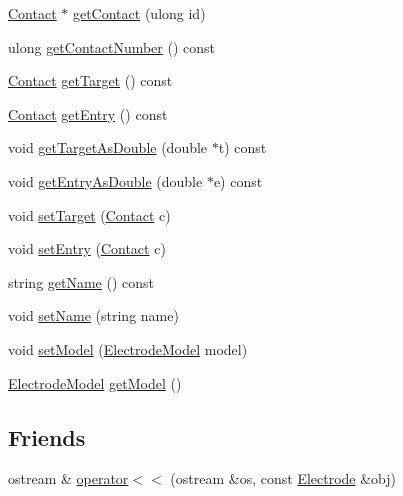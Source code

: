 \begin{DoxyCompactItemize}
\item 
\hyperlink{classElectrode_ac64c4a90469345a5d3e260da59765a76}{Contact} $\ast$ \hyperlink{classElectrode_a16095d3177a018d40cca9e13064c69ee}{get\-Contact} (ulong id)
\item 
ulong \hyperlink{classElectrode_af9d256a3bca0873bf10177ed7acc8158}{get\-Contact\-Number} () const 
\item 
\hyperlink{classElectrode_ac64c4a90469345a5d3e260da59765a76}{Contact} \hyperlink{classElectrode_ae00ce79f47c986adedfdc34de26a4956}{get\-Target} () const 
\item 
\hyperlink{classElectrode_ac64c4a90469345a5d3e260da59765a76}{Contact} \hyperlink{classElectrode_a63534a9fcf275e30a3897bc6d5c6daec}{get\-Entry} () const 
\item 
void \hyperlink{classElectrode_a7d1686e3aaf200d8eeacd5ba5ca9b8f6}{get\-Target\-As\-Double} (double $\ast$t) const 
\item 
void \hyperlink{classElectrode_a63b949ff99a7c5a25ee2a1615231d2da}{get\-Entry\-As\-Double} (double $\ast$e) const 
\item 
void \hyperlink{classElectrode_ae1db2afe30ebad7c71a04a0c4f39b326}{set\-Target} (\hyperlink{classElectrode_ac64c4a90469345a5d3e260da59765a76}{Contact} c)
\item 
void \hyperlink{classElectrode_a2092b73cb83d1d54ff3a55a0095ffdac}{set\-Entry} (\hyperlink{classElectrode_ac64c4a90469345a5d3e260da59765a76}{Contact} c)
\item 
string \hyperlink{classElectrode_a19fa13d91444e67dbdc17891829633a2}{get\-Name} () const 
\item 
void \hyperlink{classElectrode_aac0591afceba95e538b134daad423db4}{set\-Name} (string name)
\item 
void \hyperlink{classElectrode_afe109f0f82873f28d93fc5b6f485de45}{set\-Model} (\hyperlink{classElectrodeModel}{Electrode\-Model} model)
\item 
\hyperlink{classElectrodeModel}{Electrode\-Model} \hyperlink{classElectrode_aa7d23c92c952ec3c4565be8924a8be00}{get\-Model} ()
\end{DoxyCompactItemize}
\subsection*{Friends}
\begin{DoxyCompactItemize}
\item 
ostream \& \hyperlink{classElectrode_a7ffb9f309faaf4072bda7912a86b31f4}{operator$<$$<$} (ostream \&os, const \hyperlink{classElectrode}{Electrode} \&obj)
\end{DoxyCompactItemize}


